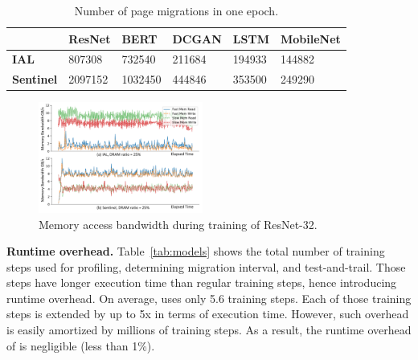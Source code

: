 \begin{table}[]
\small
\vspace{-5pt}
\caption{Number of page migrations in one epoch. %
}
\vspace{-5pt}
\begin{tabular}{|p{1.05cm}|p{1cm}|p{0.9cm}|p{1cm}|p{0.9cm}|p{1.1cm}|}
\hline
   & ResNet & BERT & DCGAN & LSTM & MobileNet \\ \hline
\textbf{IAL}  & 807308	& 732540 &	211684	&194933  & 144882 \\ \hline
\textbf{Sentinel} & 2097152	& 1032450	& 444846 &	353500  & 249290 \\ \hline
\end{tabular}
\vspace{-10pt}
\label{tab:migration}
\end{table}
\begin{figure}
\centering
\includegraphics[width=0.48\textwidth]{figures/bandwidth.pdf}
\vspace{-25pt}
\caption{\textcolor{check}{Memory access bandwidth during training of ResNet-32}.}
\vspace{-10pt}
\label{fig:bandwidth_consumption}
\end{figure}


\textcolor{check}{\textbf{Runtime overhead.}%
Table~\ref{tab:models} shows the total number of training steps used for profiling, determining migration interval,  and test-and-trail. Those steps have longer execution time than regular training steps, hence introducing runtime overhead. On average, \name uses only 5.6 training steps. Each of those training steps is extended by up to \textcolor{check}{5x} in terms of execution time. However, such overhead is easily amortized by millions of training steps. As a result, the runtime overhead of \name is negligible (less than 1\%).}


